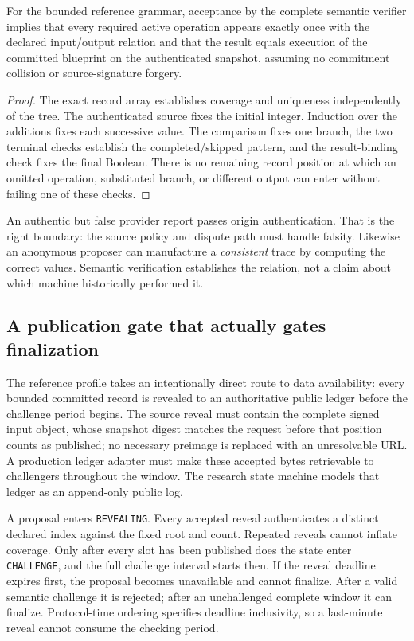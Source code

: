\begin{proposition}
For the bounded reference grammar, acceptance by the complete semantic verifier implies that every required active operation appears exactly once with the declared input/output relation and that the result equals execution of the committed blueprint on the authenticated snapshot, assuming no commitment collision or source-signature forgery.
\end{proposition}
\begin{proof}
The exact record array establishes coverage and uniqueness independently of the tree. The authenticated source fixes the initial integer. Induction over the additions fixes each successive value. The comparison fixes one branch, the two terminal checks establish the completed/skipped pattern, and the result-binding check fixes the final Boolean. There is no remaining record position at which an omitted operation, substituted branch, or different output can enter without failing one of these checks.
\end{proof}

An authentic but false provider report passes origin authentication. That is the right boundary: the source policy and dispute path must handle falsity. Likewise an anonymous proposer can manufacture a \emph{consistent} trace by computing the correct values. Semantic verification establishes the relation, not a claim about which machine historically performed it.

\subsection{A publication gate that actually gates finalization}
\label{sec:availability}

The reference profile takes an intentionally direct route to data availability: every bounded committed record is revealed to an authoritative public ledger before the challenge period begins. The source reveal must contain the complete signed input object, whose snapshot digest matches the request before that position counts as published; no necessary preimage is replaced with an unresolvable URL. A production ledger adapter must make these accepted bytes retrievable to challengers throughout the window. The research state machine models that ledger as an append-only public log.

A proposal enters \texttt{REVEALING}. Every accepted reveal authenticates a distinct declared index against the fixed root and count. Repeated reveals cannot inflate coverage. Only after every slot has been published does the state enter \texttt{CHALLENGE}, and the full challenge interval starts then. If the reveal deadline expires first, the proposal becomes unavailable and cannot finalize. After a valid semantic challenge it is rejected; after an unchallenged complete window it can finalize. Protocol-time ordering specifies deadline inclusivity, so a last-minute reveal cannot consume the checking period.


